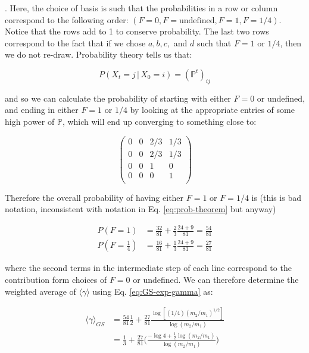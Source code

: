 \documentclass[11pt]{article}
\begin{document}
\noindent. Here, the choice of basis is such that the probabilities in a row or column correspond to the following order: $(F=0,F=\text{undefined},F=1,F=1/4)$. Notice that the rows add to 1 to conserve probability. The last two rows correspond to the fact that if we chose $a,b,c,$ and $d$ such that $F=1 \text{ or } 1/4$, then we do not re-draw. Probability theory tells us that:

\begin{equation}
    \label{eq:prob-theorem}
    P(X_t=j \, |\,X_0=i) = (\mathbb{P}^t)_{ij}
\end{equation}

\noindent and so we can calculate the probability of starting with either $F=0$ or undefined, and ending in either $F=1 \text{ or } 1/4$ by looking at the appropriate entries of some high power of $\mathbb{P}$, which will end up converging to something close to:

\begin{equation}
        \begin{pmatrix}
        0 & 0 & 2/3 & 1/3 \\
        0 & 0 & 2/3 & 1/3 \\
        0 & 0 & 1 & 0 \\
        0 & 0 & 0 & 1 \\
    \end{pmatrix}
\end{equation}

\noindent Therefore the overall probability of having either $F=1$ or $F=1/4$ is (this is bad notation, inconsistent with notation in Eq. \eqref{eq:prob-theorem} but anyway)

\begin{align}
    P(F=1) & = \frac{32}{81}+ \frac{2}{3}\frac{24+9}{81} = \frac{54}{81}\\
    P(F=\frac{1}{4}) & = \frac{16}{81}+ \frac{1}{3}\frac{24+9}{81} = \frac{27}{81}
\end{align}

\noindent where the second terms in the intermediate step of each line correspond to the contribution form choices of $F=0$ or undefined. We can therefore determine the weighted average of $\langle \gamma\rangle$ using Eq. \eqref{eq:GS-exp-gamma} as:

\begin{align*}
    \langle \gamma\rangle_{GS} & = \frac{54}{81}\frac{1}{2} + \frac{27}{81}\frac{\log{[(1/4)(m_2/m_1)^{1/2}]}}{\log{(m_2/m_1)}} \\
    & = \frac{1}{3}+\frac{27}{81}\bigg( \frac{-\log{4} + \frac{1}{2}\log{(m_2/m_1)}}{\log{(m_2/m_1)}}\bigg)
\end{align*}
\end{document}

